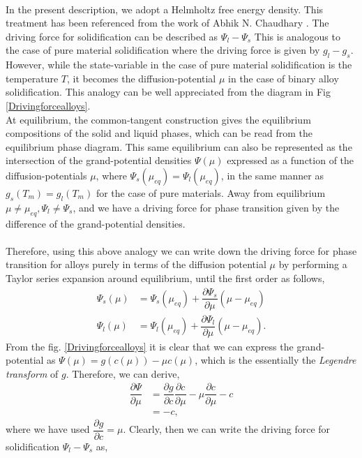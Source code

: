\documentclass[12pt,a4paper]{report}
\begin{document}
\\
  In the present description, we adopt a Helmholtz free energy density. This treatment has been referenced from the work of Abhik N. Chaudhary \cite{Abhik_1}. The driving force for solidification can be described as $\Psi_l-\Psi_s$ This is analogous to the case of pure material solidification where the driving force is given by $g_l-g_s$.  
  However, while the state-variable in the case of pure material solidification is the temperature $T$, 
  it becomes the diffusion-potential $\mu$ in the case of binary alloy solidification. This analogy 
  can be well appreciated from the diagram in Fig \ref{Drivingforcealloys}.\\
  
  At equilibrium, the common-tangent construction gives the equilibrium compositions of the solid and liquid phases, which can be read from the equilibrium phase diagram. This same equilibrium can also be represented as the intersection of the grand-potential densities $\Psi\left(\mu\right)$ expressed as 
  a function of the diffusion-potentials $\mu$, where $\Psi_s\left(\mu_{eq}\right)=\Psi_l\left(\mu_{eq}\right)$, 
  in the same manner as $g_s(T_m)= g_l(T_m)$ for the case of pure materials. Away from equilibrium  $\mu\neq\mu_{eq}, \Psi_l\neq \Psi_s$, and we have a driving force for phase transition given by the difference of the grand-potential densities.\\
  \\
  Therefore, using this above analogy we can write down the driving force for phase transition for alloys purely in terms of the diffusion potential $\mu$ by performing a Taylor series expansion around equilibrium, until the 
  first order as follows, 
  \begin{align}
  \Psi_s\left(\mu\right) &= \Psi_s\left(\mu_{eq}\right) + \dfrac{\partial \Psi_s}{\partial \mu}\left(\mu-\mu_{eq}\right)\\
  \Psi_l\left(\mu\right) &= \Psi_l\left(\mu_{eq}\right) + \dfrac{\partial \Psi_l}{\partial \mu}\left(\mu-\mu_{eq}\right).
  \end{align}
  From the fig. \ref{Drivingforcealloys} it is clear that we can express the 
  grand-potential as $\Psi(\mu) = g(c(\mu)) -\mu c\left(\mu\right)$, which is the 
  essentially the \textit{Legendre transform} of $g$. Therefore, we can derive, 
  \begin{align*}
   \dfrac{\partial \Psi}{\partial \mu} &= \dfrac{\partial g}{\partial c}\dfrac{\partial c}{\partial \mu} - \mu \dfrac{\partial c}{\partial \mu} -c\\
                                       &= -c,
  \end{align*}
  where we have used $\dfrac{\partial g}{\partial c}=\mu$. Clearly, then we can write 
  the driving force for solidification $\Psi_l-\Psi_s$ as,
  
\end{document}

